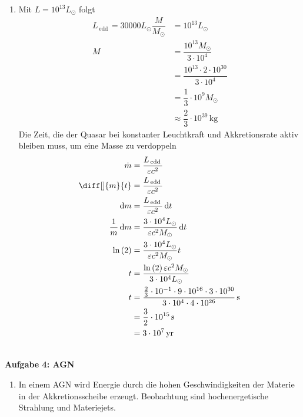 \documentclass[a4paper,12pt]{article}
\newcommand{\td}{\,\text{d}}
\numberwithin{equation}{section}
\begin{document}
\begin{enumerate}[label=\arabic*.]
        \item Mit $L=10^{13}L_\odot$ folgt
                \begin{align*} 
                        L_{\,\text{edd}\,}=30000L_\odot\dfrac{M}{M_\odot}&=10^{13}L_\odot\\
                        M&=\dfrac{10^{13}M_\odot}{3\cdot 10^4}\\
                         &=\dfrac{10^{13}\cdot 2\cdot 10^{30}}{3\cdot 10^4}\\
                         &=\dfrac{1}{3}\cdot 10^{9}M_\odot\\
                         &\approx \dfrac{2}{3}\cdot 10^{39}\,\text{kg}\,
                \end{align*} 
                Die Zeit, die der Quasar bei konstanter Leuchtkraft und Akkretionsrate aktiv bleiben muss, um eine Masse zu verdoppeln
                \begin{align*} 
                        \dot{m}&=\dfrac{L_{\,\text{edd}\,}}{\varepsilon c^2}\\
                        \diff[]{m}{t}&=\dfrac{L_{\,\text{edd}\,}}{\varepsilon c^2}\\
                        \td m&=\dfrac{L_{\,\text{edd}\,}}{\varepsilon c^2}\td t\\
                        \dfrac{1}{m}\td m&=\dfrac{3\cdot 10^4L_\odot}{\varepsilon c^2M_\odot}\td t\\
                        \ln\left(2\right)&=\dfrac{3\cdot 10^4L_\odot}{\varepsilon c^2M_\odot}t\\
                        t&=\dfrac{\ln\left(2\right)\varepsilon c^2M_\odot}{3\cdot 10^4L_\odot}\\
                        t&=\dfrac{\tfrac{2}{3}\cdot 10^{-1}\cdot 9\cdot 10^{16}\cdot 3\cdot 10^{30}}{3\cdot 10^4\cdot 4\cdot 10^{26}}\,\text{s}\,\\
                         &=\dfrac{3}{2}\cdot 10^{15}\,\text{s}\,\\
                         &=3\cdot 10^7\,\text{yr}\,
                \end{align*} 
\end{enumerate}
\hfill\\\textbf{Aufgabe 4: AGN}
\begin{enumerate}[label=\arabic*.]
        \item In einem AGN wird Energie durch die hohen Geschwindigkeiten der Materie in der Akkretionsscheibe erzeugt. Beobachtung sind hochenergetische Strahlung und Materiejets.
\end{enumerate}
\end{document}
